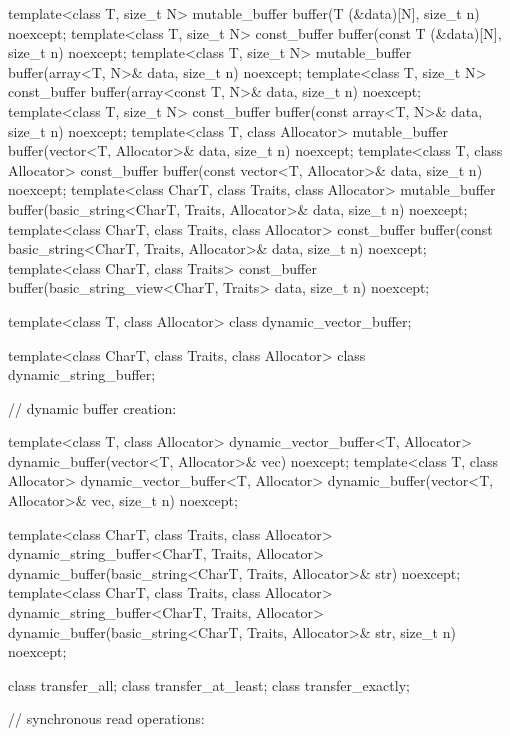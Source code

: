 \begin{codeblock}
{{{{  template<class T, size_t N>
    mutable_buffer buffer(T (&data)[N], size_t n) noexcept;
  template<class T, size_t N>
    const_buffer buffer(const T (&data)[N], size_t n) noexcept;
  template<class T, size_t N>
    mutable_buffer buffer(array<T, N>& data, size_t n) noexcept;
  template<class T, size_t N>
    const_buffer buffer(array<const T, N>& data, size_t n) noexcept;
  template<class T, size_t N>
    const_buffer buffer(const array<T, N>& data, size_t n) noexcept;
  template<class T, class Allocator>
    mutable_buffer buffer(vector<T, Allocator>& data, size_t n) noexcept;
  template<class T, class Allocator>
    const_buffer buffer(const vector<T, Allocator>& data, size_t n) noexcept;
  template<class CharT, class Traits, class Allocator>
    mutable_buffer buffer(basic_string<CharT, Traits, Allocator>& data,
                          size_t n) noexcept;
  template<class CharT, class Traits, class Allocator>
    const_buffer buffer(const basic_string<CharT, Traits, Allocator>& data,
                        size_t n) noexcept;
  template<class CharT, class Traits>
    const_buffer buffer(basic_string_view<CharT, Traits> data,
                        size_t n) noexcept;

  template<class T, class Allocator>
    class dynamic_vector_buffer;

  template<class CharT, class Traits, class Allocator>
    class dynamic_string_buffer;

  // dynamic buffer creation:

  template<class T, class Allocator>
    dynamic_vector_buffer<T, Allocator>
    dynamic_buffer(vector<T, Allocator>& vec) noexcept;
  template<class T, class Allocator>
    dynamic_vector_buffer<T, Allocator>
    dynamic_buffer(vector<T, Allocator>& vec, size_t n) noexcept;

  template<class CharT, class Traits, class Allocator>
    dynamic_string_buffer<CharT, Traits, Allocator>
    dynamic_buffer(basic_string<CharT, Traits, Allocator>& str) noexcept;
  template<class CharT, class Traits, class Allocator>
    dynamic_string_buffer<CharT, Traits, Allocator>
    dynamic_buffer(basic_string<CharT, Traits, Allocator>& str, size_t n) noexcept;

  class transfer_all;
  class transfer_at_least;
  class transfer_exactly;

  // synchronous read operations:

}}}}
\end{codeblock}
